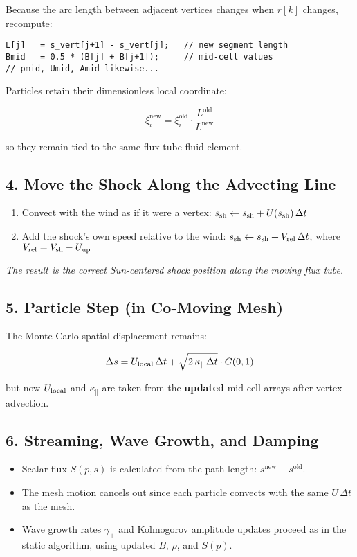 Because the arc length between adjacent vertices changes when $r[k]$ changes, recompute:

\begin{lstlisting}
L[j]   = s_vert[j+1] - s_vert[j];   // new segment length
Bmid   = 0.5 * (B[j] + B[j+1]);     // mid-cell values
// ρmid, Umid, Amid likewise...
\end{lstlisting}

Particles retain their dimensionless local coordinate:

\[
\xi_i^{\text{new}} = \xi_i^{\text{old}} \cdot \frac{L^{\text{old}}}{L^{\text{new}}}
\]

so they remain tied to the same flux-tube fluid element.

\subsection*{4. Move the \textbf{Shock} Along the Advecting Line}

\begin{enumerate}
    \item Convect with the wind as if it were a vertex: \quad $s_{\rm sh} \leftarrow s_{\rm sh} + U(s_{\rm sh}) \,\Delta t$
    \item Add the shock’s own speed relative to the wind: \quad $s_{\rm sh} \leftarrow s_{\rm sh} + V_{\rm rel}\,\Delta t$, \quad where $V_{\rm rel} = V_{\rm sh} - U_{\text{up}}$
\end{enumerate}

\textit{The result is the correct Sun-centered shock position along the moving flux tube.}

\subsection*{5. Particle Step (in Co-Moving Mesh)}

The Monte Carlo spatial displacement remains:

\[
\Delta s = U_{\rm local}\,\Delta t + \sqrt{2\,\kappa_\parallel\,\Delta t} \cdot G(0,1)
\]

but now $U_{\rm local}$ and $\kappa_\parallel$ are taken from the \textbf{updated} mid-cell arrays after vertex advection.

\subsection*{6. Streaming, Wave Growth, and Damping}

\begin{itemize}
    \item Scalar flux $S(p,s)$ is calculated from the path length: $s^{\text{new}} - s^{\text{old}}$.
    \item The mesh motion cancels out since each particle convects with the same $U\,\Delta t$ as the mesh.
    \item Wave growth rates $\gamma_\pm$ and Kolmogorov amplitude updates proceed as in the static algorithm, using updated $B$, $\rho$, and $S(p)$.
\end{itemize}

